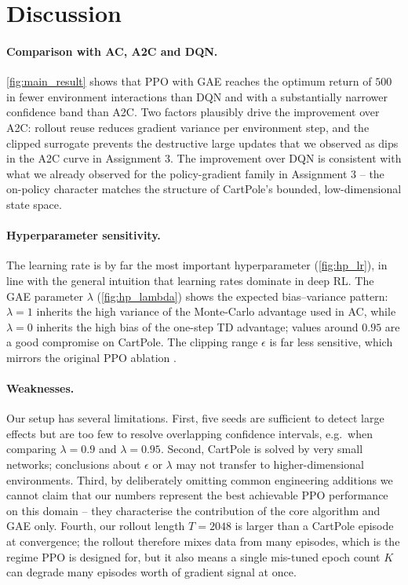 \documentclass{article}
\theoremstyle{plain}
\theoremstyle{definition}
\theoremstyle{remark}
\begin{document}
\section{Discussion}\label{sec:discussion}

\paragraph{Comparison with AC, A2C and DQN.}
\autoref{fig:main_result} shows that PPO with GAE reaches the optimum return of $500$ in fewer environment interactions than DQN and with a substantially narrower confidence band than A2C. Two factors plausibly drive the improvement over A2C: rollout reuse reduces gradient variance per environment step, and the clipped surrogate prevents the destructive large updates that we observed as dips in the A2C curve in Assignment 3. The improvement over DQN is consistent with what we already observed for the policy-gradient family in Assignment 3 -- the on-policy character matches the structure of CartPole's bounded, low-dimensional state space.

\paragraph{Hyperparameter sensitivity.}
The learning rate is by far the most important hyperparameter (\autoref{fig:hp_lr}), in line with the general intuition that learning rates dominate in deep RL. The GAE parameter $\lambda$ (\autoref{fig:hp_lambda}) shows the expected bias--variance pattern: $\lambda=1$ inherits the high variance of the Monte-Carlo advantage used in AC, while $\lambda=0$ inherits the high bias of the one-step TD advantage; values around $0.95$ are a good compromise on CartPole. The clipping range $\epsilon$ is far less sensitive, which mirrors the original PPO ablation \cite{schulman2017ppo}.

\paragraph{Weaknesses.}
Our setup has several limitations. First, five seeds are sufficient to detect large effects but are too few to resolve overlapping confidence intervals, e.g.\ when comparing $\lambda=0.9$ and $\lambda=0.95$. Second, CartPole is solved by very small networks; conclusions about $\epsilon$ or $\lambda$ may not transfer to higher-dimensional environments. Third, by deliberately omitting common engineering additions we cannot claim that our numbers represent the best achievable PPO performance on this domain -- they characterise the contribution of the core algorithm and GAE only. Fourth, our rollout length $T=2048$ is larger than a CartPole episode at convergence; the rollout therefore mixes data from many episodes, which is the regime PPO is designed for, but it also means a single mis-tuned epoch count $K$ can degrade many episodes worth of gradient signal at once.
\end{document}
